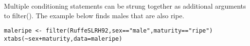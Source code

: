 \documentclass{beamer}
\begin{document}
\begin{frame}[fragile]
Multiple conditioning statements can be strung together as additional arguments to filter(). The example below finds males that are also ripe.

\begin{framed}
\begin{verbatim}
maleripe <- filter(RuffeSLRH92,sex=="male",maturity=="ripe")
xtabs(~sex+maturity,data=maleripe)
\end{verbatim}
\end{framed}

\end{frame}
\end{document}
